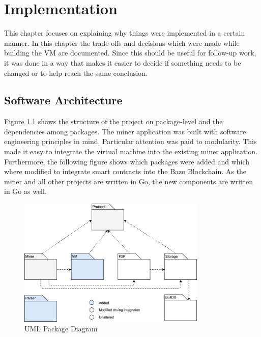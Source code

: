 \chapter{Implementation}
\thispagestyle{main} %
This chapter focuses on explaining why things were implemented in a certain manner. In this chapter the trade-offs and decisions which were made while building the VM are documented. Since this should be useful for follow-up work, it was done in a way that makes it easier to decide if something needs to be changed or to help reach the same conclusion.

\section{Software Architecture}
Figure \ref{package overview} shows the structure of the project on package-level and the dependencies among packages. The miner application was built with software engineering principles in mind. Particular attention was paid to modularity. This made it easy to integrate the virtual machine into the existing miner application. Furthermore, the following figure shows which packages were added and which where modified to integrate smart contracts into the Bazo Blockchain. As the miner and all other projects are written in Go, the new components are written in Go as well.
\begin{figure}[H]
	\begin{center}
	\includegraphics[width=0.8\textwidth]{./images/package-diagram}
	\caption{UML Package Diagram}
	\label{package overview}
	\end{center}
  \end{figure}

